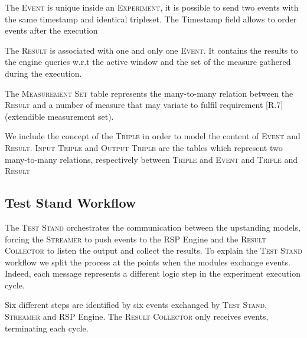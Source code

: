 The \textsc{Event} is unique inside an \textsc{Experiment}, it is possible to send two events with the same timestamp and identical tripleset. The Timestamp field allows to order events after the execution

The \textsc{Result} is associated with one and only one \textsc{Event}. It contains the results to the engine queries w.r.t the active window and the set of the measure gathered during the execution. 

The \textsc{Measurement Set} table represents the many-to-many relation between the \textsc{Result} and a number of measure that may variate  to fulfil requirement [R.7] (extendible measurement set). 

We include the concept of the \textsc{Triple} in order to model the content of \textsc{Event} and \textsc{Result}. \textsc{Input Triple} and \textsc{Output Triple} are the tables which represent two many-to-many relations, respectively between \textsc{Triple} and \textsc{Event} and \textsc{Triple}  and \textsc{Result}

\subsection{Test Stand Workflow}\label{sec:test-stand-workflow}

\noindent The \textsc{Test Stand} orchestrates the communication between the upstanding models, forcing the \textsc{Streamer} to push events to the RSP Engine and the \textsc{Result Collector} to listen the output and collect the results. To explain the \textsc{Test Stand} workflow we split the process at the points when the modules exchange events. Indeed, each message represents a different logic step in the experiment execution cycle.

Six different steps are identified by six events exchanged by \textsc{Test Stand}, \textsc{Streamer} and RSP Engine. The \textsc{Result Collector} only receives events, terminating each cycle.

